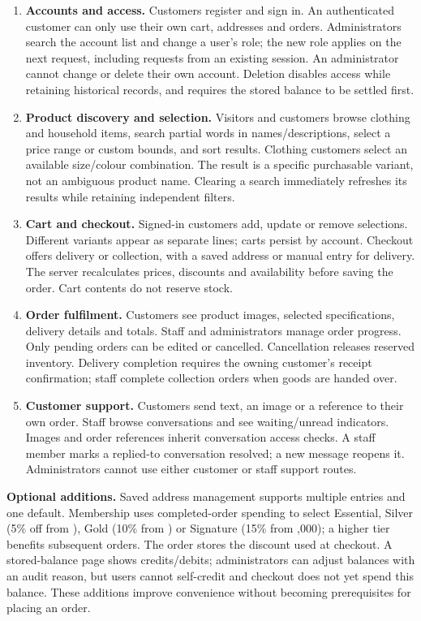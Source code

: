 \documentclass[11pt,a4paper]{article}
\newcommand{\EUR}{\texteuro}
\begin{document}
\begin{enumerate}
\item \textbf{Accounts and access.} Customers register and sign in. An authenticated customer can only use their own cart, addresses and orders. Administrators search the account list and change a user's role; the new role applies on the next request, including requests from an existing session. An administrator cannot change or delete their own account. Deletion disables access while retaining historical records, and requires the stored balance to be settled first.
\item \textbf{Product discovery and selection.} Visitors and customers browse clothing and household items, search partial words in names/descriptions, select a price range or custom bounds, and sort results. Clothing customers select an available size/colour combination. The result is a specific purchasable variant, not an ambiguous product name. Clearing a search immediately refreshes its results while retaining independent filters.
\item \textbf{Cart and checkout.} Signed-in customers add, update or remove selections. Different variants appear as separate lines; carts persist by account. Checkout offers delivery or collection, with a saved address or manual entry for delivery. The server recalculates prices, discounts and availability before saving the order. Cart contents do not reserve stock.
\item \textbf{Order fulfilment.} Customers see product images, selected specifications, delivery details and totals. Staff and administrators manage order progress. Only pending orders can be edited or cancelled. Cancellation releases reserved inventory. Delivery completion requires the owning customer's receipt confirmation; staff complete collection orders when goods are handed over.
\item \textbf{Customer support.} Customers send text, an image or a reference to their own order. Staff browse conversations and see waiting/unread indicators. Images and order references inherit conversation access checks. A staff member marks a replied-to conversation resolved; a new message reopens it. Administrators cannot use either customer or staff support routes.
\end{enumerate}

\textbf{Optional additions.} Saved address management supports multiple entries and one default. Membership uses completed-order spending to select Essential, Silver (5\% off from \EUR200), Gold (10\% from \EUR500) or Signature (15\% from \EUR1,000); a higher tier benefits subsequent orders. The order stores the discount used at checkout. A stored-balance page shows credits/debits; administrators can adjust balances with an audit reason, but users cannot self-credit and checkout does not yet spend this balance. These additions improve convenience without becoming prerequisites for placing an order.
\end{document}
